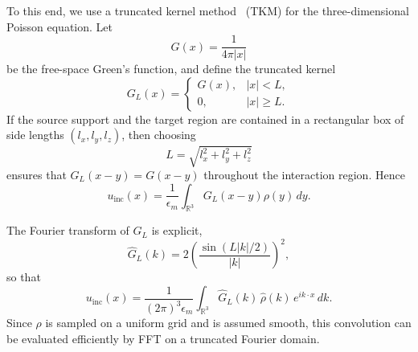 \documentclass[preprint,12pt]{elsarticle}
\begin{document}
To this end, we use a truncated kernel method~\cite{VICO2016191} (TKM) for the three-dimensional Poisson equation. 
Let
\begin{equation}
    G(x)=\frac{1}{4\pi |x|}
\end{equation}
be the free-space Green's function, and define the truncated kernel
\begin{equation}
    G_L(x)
    =
    \begin{cases}
        G(x), & |x|<L,\\
        0, & |x|\ge L.
    \end{cases}
\end{equation}
If the source support and the target region are contained in a rectangular box of side lengths \((l_x,l_y,l_z)\), then choosing
\begin{equation}
    L=\sqrt{l_x^2+l_y^2+l_z^2}
\end{equation}
ensures that \(G_L(x-y)=G(x-y)\) throughout the interaction region. 
Hence
\begin{equation}
    u_{\mathrm{inc}}(x)
    =
    \frac{1}{\epsilon_m}
    \int_{\mathbb{R}^3} G_L(x-y)\rho(y)\,dy.
\end{equation}

The Fourier transform of \(G_L\) is explicit,
\begin{equation}
    \widehat{G}_L(k)
    =
    2\left(\frac{\sin(L|k|/2)}{|k|}\right)^2,
\end{equation}
so that
\begin{equation}\label{eq:tkm_convolution}
    u_{\mathrm{inc}}(x)
    =
    \frac{1}{(2\pi)^3\epsilon_m}
    \int_{\mathbb{R}^3}
    \widehat{G}_L(k)\,\widehat{\rho}(k)\,e^{ik\cdot x}\,dk.
\end{equation}
Since \(\rho\) is sampled on a uniform grid and is assumed smooth, this convolution can be evaluated efficiently by FFT on a truncated Fourier domain.
\end{document}
